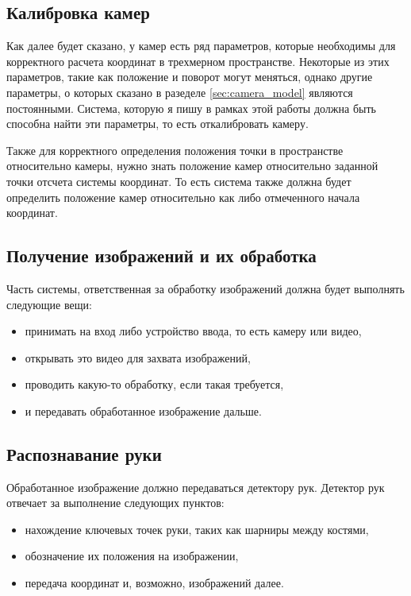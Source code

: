 \documentclass[12pt, a4paper]{article}
\begin{document}
\subsection{Калибровка камер}
Как далее будет сказано, у камер есть ряд параметров, которые необходимы для
корректного расчета координат в трехмерном пространстве. Некоторые из этих
параметров, такие как положение и поворот могут меняться, однако другие
параметры, о которых сказано в разеделе \ref{sec:camera_model} являются
постоянными.  Система, которую я пишу в рамках этой работы должна быть способна
найти эти параметры, то есть откалибровать камеру.
\par
Также для корректного определения положения точки в пространстве относительно
камеры, нужно знать положение камер относительно заданной точки отсчета системы
координат. То есть система также должна будет определить положение камер
относительно как либо отмеченного начала координат.

\subsection{Получение изображений и их обработка}
Часть системы, ответственная за обработку изображений должна будет выполнять следующие вещи:
\begin{itemize}
    \item принимать на вход либо устройство ввода, то есть камеру или видео,
    \item открывать это видео для захвата изображений,
    \item проводить какую-то обработку, если такая требуется,
    \item и передавать обработанное изображение дальше.
\end{itemize} 

\subsection{Распознавание руки}
Обработанное изображение должно передаваться детектору рук. Детектор рук отвечает за выполнение следующих пунктов:
\begin{itemize}
    \item нахождение ключевых точек руки, таких как шарниры между костями,
    \item обозначение их положения на изображении,
    \item передача координат и, возможно, изображений далее.
\end{itemize}   
\end{document}
